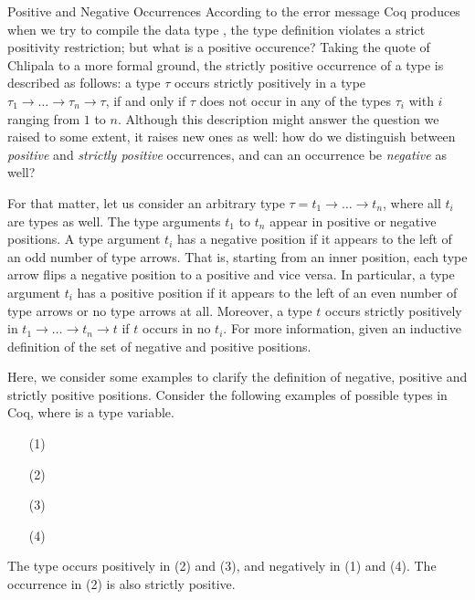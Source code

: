 \begin{excursus}{Positive and Negative Occurrences}
According to the error message Coq produces when we try to compile the data type , the type definition violates a strict positivity restriction; but what is a positive occurence?
Taking the quote of Chlipala to a more formal ground, the strictly positive occurrence of a type is described as follows: a type $\tau$ occurs strictly positively in a type $\tau_1\rightarrow \dots \rightarrow \tau_n \rightarrow \tau$, if and only if $\tau$ does not occur in any of the types $\tau_i$ with $i$ ranging from $1$ to $n$.
Although this description might answer the question we raised to some extent, it raises new ones as well: how do we distinguish between \emph{positive} and \emph{strictly positive} occurrences, and can an occurrence be \emph{negative} as well?

For that matter, let us consider an arbitrary type $\tau = t_1 \rightarrow \dots \rightarrow t_n$, where all $t_i$ are types as well.
The type arguments $t_1$ to $t_n$ appear in positive or negative positions.
A type argument $t_i$ has a negative position if it appears to the left of an odd number of type arrows.
That is, starting from an inner position, each type arrow flips a negative position to a positive and vice versa.
In particular, a type argument $t_i$ has a positive position if it appears to the left of an even number of type arrows or no type arrows at all.
Moreover, a type $t$ occurs strictly positively in $t_1 \rightarrow \dots \rightarrow t_n \rightarrow t$ if $t$ occurs in no $t_i$.
For more information, \citet{blanqui2002inductivedatatype}  given an inductive definition of the set of negative and positive positions.

Here, we consider some examples to clarify the definition of negative, positive and strictly positive positions.
Consider the following examples of possible types in Coq, where  is a type variable.

\begin{enumerate}
\item[(1)] 
\item[(2)] 
\item[(3)] 
\item[(4)] 
\end{enumerate}

The type  occurs positively in (2) and (3), and negatively in (1) and (4).
The occurrence in (2) is also strictly positive.


\end{excursus}
